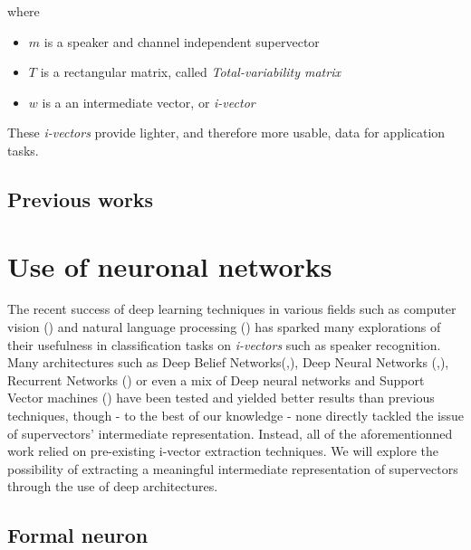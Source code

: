\documentclass[conference]{IEEEtran}
\begin{document}
where
\begin{itemize}
\item $m$ is a speaker and channel independent supervector
\item $T$ is a rectangular matrix, called \emph{Total-variability matrix}
\item $w$ is a an intermediate vector, or \emph{i-vector}
\end{itemize}

These \emph{i-vectors} provide lighter, and therefore more usable, data for application tasks.

\subsection{Previous works}

\section{Use of neuronal networks}
\label{sec:Deep}
The recent success of deep learning techniques in various fields such as
computer vision (\cite{lecun1998gradient}) and natural language processing (\cite{bordes2012joint}) has sparked
many explorations of their usefulness in classification tasks on
\emph{i-vectors} such as speaker recognition. Many architectures such as Deep
Belief Networks(\cite{DBLP:journals/corr/GhahabiH15},\cite{ghahabi2014deep}),
Deep Neural Networks
(\cite{DBLP:journals/corr/GhahabiH15},\cite{ghahabi2014deep}), Recurrent
Networks (\cite{DBLP:journals/corr/SaonSRK16}) or even a mix of
Deep neural networks and Support Vector machines (\cite{richardson2015deep}) have been tested and yielded
better results than previous techniques, though - to the best of our knowledge -
none directly tackled the issue of supervectors' intermediate representation.
Instead, all of the aforementionned work relied on pre-existing i-vector
extraction techniques. We will explore the possibility of extracting a
meaningful intermediate representation of supervectors through the use of deep architectures.

\subsection{Formal neuron}
\end{document}
